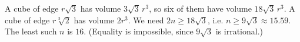 A cube of edge $r\sqrt3$ has volume $3\sqrt3\,r^3$, so six of them have volume $18\sqrt3\,r^3$. A cube of edge $r\sqrt[3]2$ has volume $2r^3$. We need $2n\ge18\sqrt3$, i.e. $n\ge9\sqrt3\approx15.59$. The least such $n$ is $\boxed{16}$. (Equality is impossible, since $9\sqrt3$ is irrational.)

